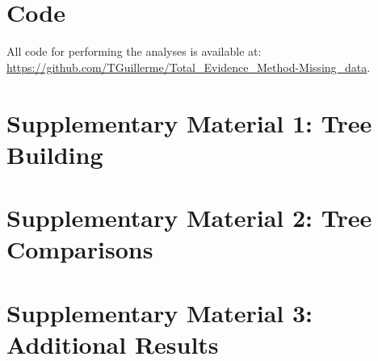 \section{Code}
All code for performing the analyses is available at: \url{https://github.com/TGuillerme/Total_Evidence_Method-Missing_data}.

\newpage
\section{Supplementary Material 1: Tree Building}
  
  \label{Supp_TreeBuilding}

\newpage
\section{Supplementary Material 2: Tree Comparisons}
  
  \label{Supp_TreeComparison}

\newpage
\section{Supplementary Material 3: Additional Results}
  
  \label{Supp_results}

%    
%    